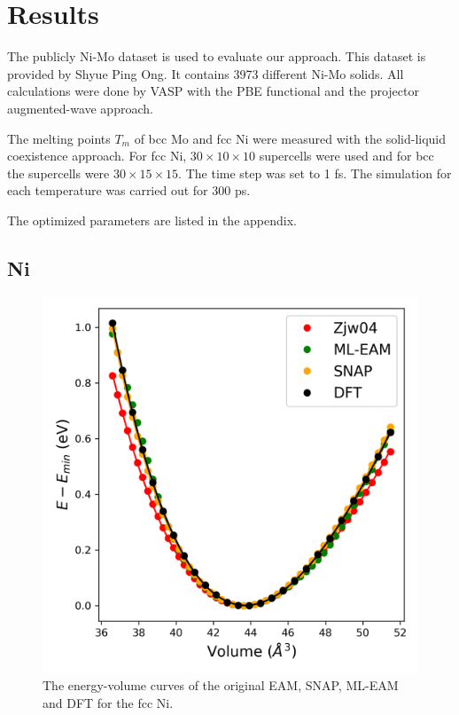 \documentclass[prb,reprint]{revtex4-2}
\begin{document}
% 
%
\section{Results}
\label{sec:results}

The publicly Ni-Mo dataset is used to evaluate our approach. This dataset is 
provided by Shyue Ping Ong. It contains 3973 different Ni-Mo solids. All 
calculations were done by VASP with the PBE functional and the projector 
augmented-wave approach. 

The melting points $T_{m}$ of bcc Mo and fcc Ni were measured with the 
solid-liquid coexistence approach. For fcc Ni, $30 \times 10 \times 10$ 
supercells were used and for bcc the supercells were $30 \times 15 \times 15$. 
The time step was set to 1 fs. The simulation for each temperature was carried 
out for 300 ps.

The optimized parameters are listed in the appendix.

% 
%
\subsection{Ni}
\label{sec:elementary_Ni}

% 
%
\begin{figure}[htp]
\centering
\includegraphics[scale=0.65]{figures/Ni_all_eos.png}
\caption{\label{fig:Ni_eam_eos} The energy-volume curves of the original EAM, 
SNAP, ML-EAM and DFT for the fcc Ni.}
\end{figure}
\end{document}
